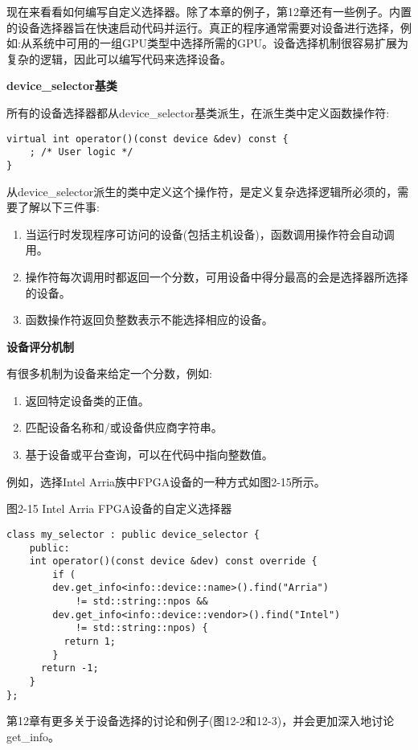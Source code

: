 现在来看看如何编写自定义选择器。除了本章的例子，第12章还有一些例子。内置的设备选择器旨在快速启动代码并运行。真正的程序通常需要对设备进行选择，例如:从系统中可用的一组GPU类型中选择所需的GPU。设备选择机制很容易扩展为复杂的逻辑，因此可以编写代码来选择设备。\par

\hspace*{\fill} \par %
\textbf{device\_selector基类}

所有的设备选择器都从device\_selector基类派生，在派生类中定义函数操作符:\par

\begin{lstlisting}[caption={}]
virtual int operator()(const device &dev) const {
	; /* User logic */
}
\end{lstlisting}

从device\_selector派生的类中定义这个操作符，是定义复杂选择逻辑所必须的，需要了解以下三件事:\par

\begin{enumerate}
	\item 当运行时发现程序可访问的设备(包括主机设备)，函数调用操作符会自动调用。
	\item 操作符每次调用时都返回一个分数，可用设备中得分最高的会是选择器所选择的设备。
	\item 函数操作符返回负整数表示不能选择相应的设备。
\end{enumerate}

\hspace*{\fill} \par %
\textbf{设备评分机制}

有很多机制为设备来给定一个分数，例如:\par

\begin{enumerate}
	\item 返回特定设备类的正值。
	\item 匹配设备名称和/或设备供应商字符串。
	\item 基于设备或平台查询，可以在代码中指向整数值。
\end{enumerate}

例如，选择Intel Arria族中FPGA设备的一种方式如图2-15所示。\par

图2-15 Intel Arria FPGA设备的自定义选择器
\begin{lstlisting}[caption={}]
class my_selector : public device_selector {
	public:
	int operator()(const device &dev) const override {
		if (
		dev.get_info<info::device::name>().find("Arria")
			!= std::string::npos &&
		dev.get_info<info::device::vendor>().find("Intel")
			!= std::string::npos) {
		  return 1;
		}
	  return -1;
	}
};
\end{lstlisting}

第12章有更多关于设备选择的讨论和例子(图12-2和12-3)，并会更加深入地讨论get\_info。\par



